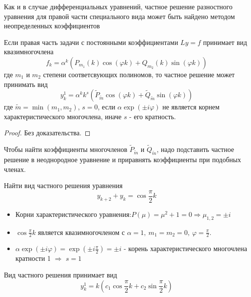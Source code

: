 Как и в случае дифференциальных уравнений, частное решение разностного уравнения для правой части
специального вида может быть найдено методом неопределенных коэффициентов

\begin{statement}
  Если правая часть задачи с постоянными коэффициентами $Ly=f$ принимает вид квазимногочлена
  \[f_k=\alpha^k(P_{m_1}(k)\cos{(\varphi k)}+Q_{m_2}(k)\sin{(\varphi k)})\]
  где $m_1$ и $m_2$ степени соответсвующих полиномов,
  то частное решение может принимать вид
  \[y^1_k=\alpha^kk^s(\tilde{P}_{\tilde{m}}\cos{(\varphi k)}+\tilde{Q}_{\tilde{m}}\sin{(\varphi k)})\]
  где $\tilde{m}=\min{(m_1,m_2)}$, $s = 0$, если $\alpha \exp{(\pm i\varphi)}$ не
  является корнем характеристического многочлена, иначе $s$ - его кратность.
\end{statement}
\begin{proof}
  Без доказательства.
\end{proof}

Чтобы найти коэффициенты многочленов $\tilde{P}_{\tilde{m}}$
и $\tilde{Q}_{\tilde{m}}$, надо подставить
частное решение  в неоднородное уравнение
и приравнять коэффициенты при подобных членах.

\begin{example}
  Найти вид частного решения уравнения
  \[y_{k+2}+y_{k}=\cos{\frac{\pi}{2}k}\]
  \begin{itemize}
    \item Корни характеристического уравнения:$P(\mu)=\mu^2+1=0\Rightarrow \mu_{1,2}=\pm i$
    \item $\cos{\frac{\pi}{2}k}$ является квазимногочленом с $\alpha=1,\ m_1=m_2=0,\ \varphi=\frac{\pi}{2}$.
    \item $\alpha \exp{(\pm i\varphi)}=\exp{\left(\pm i\frac{\pi}{2}\right)}=\pm i$ - корень характеристического многочлена кратности 1 $\Rightarrow$ $s = 1$
  \end{itemize}
  Вид частного решения принимает вид
  \[y^1_k=k\left(c_1\cos{\frac{\pi}{2}k}+c_2\sin{\frac{\pi}{2}k}\right)\]
\end{example}
